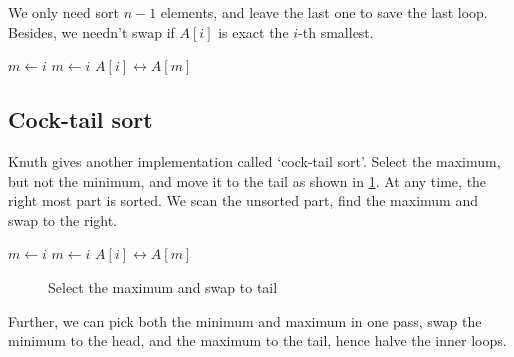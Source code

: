 \documentclass[b5paper]{article}
\begin{document}
We only need sort $n-1$ elements, and leave the last one to save the last loop. Besides, we needn't swap if $A[i]$ is exact the $i$-th smallest.

\begin{algorithmic}[1]
    \State $m \gets i$
        \State $m \gets i$
      \EndIf
    \EndFor
      \State {} $A[i] \leftrightarrow A[m]$
    \EndIf
  \EndFor
\EndProcedure
\end{algorithmic}

\subsection{Cock-tail sort}

Knuth gives another implementation\cite{TAOCP} called `cock-tail sort'. Select the maximum, but not the minimum, and move it to the tail as shown in \cref{fig:knuth-ssort}. At any time, the right most part is sorted. We scan the unsorted part, find the maximum and swap to the right.

\begin{algorithmic}[1]
    \State $m \gets i$
        \State $m \gets i$
      \EndIf
    \EndFor
    \State {} $A[i] \leftrightarrow A[m]$
  \EndFor
\EndProcedure
\end{algorithmic}

\begin{figure}[htbp]
  \centering
  \caption{Select the maximum and swap to tail}
  \label{fig:knuth-ssort}
\end{figure}

Further, we can pick both the minimum and maximum in one pass, swap the minimum to the head, and the maximum to the tail, hence halve the inner loops.
\end{document}

